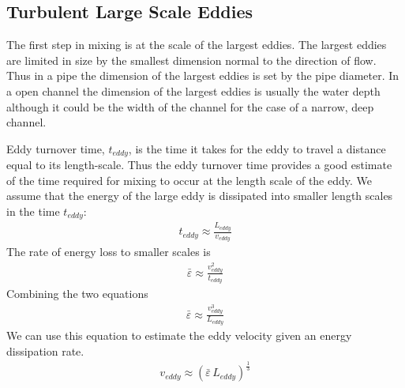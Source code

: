 \documentclass[letterpaper,10pt,english]{sphinxmanual}
\begin{document}
\subsection{Turbulent Large Scale Eddies}
\label{\detokenize{Rapid_Mix/RM_Derivations:turbulent-large-scale-eddies}}\label{\detokenize{Rapid_Mix/RM_Derivations:heading-turbulent-large-scale-eddies}}
The first step in mixing is at the scale of the largest eddies. The largest eddies are limited in size by the smallest dimension normal to the direction of flow. Thus in a pipe the dimension of the largest eddies is set by the pipe diameter. In a open channel the dimension of the largest eddies is usually the water depth although it could be the width of the channel for the case of a narrow, deep channel.

Eddy turnover time, \(t_{eddy}\), is the time it takes for the eddy to travel a distance equal to its length-scale. Thus the eddy turnover time provides a good estimate of the time required for mixing to occur at the length scale of the eddy. We assume that the energy of the large eddy is dissipated into smaller length scales in the time \(t_{eddy}\):
\begin{equation}\label{equation:Rapid_Mix/RM_Derivations:Rapid_Mix/RM_Derivations:34}
\begin{split}t_{eddy} \approx \frac{L_{eddy}}{v_{eddy}}\end{split}
\end{equation}
The rate of energy loss to smaller scales is
\begin{equation}\label{equation:Rapid_Mix/RM_Derivations:Rapid_Mix/RM_Derivations:35}
\begin{split}\bar\varepsilon \approx\frac{v_{eddy}^2}{t_{eddy}}\end{split}
\end{equation}
Combining the two equations
\begin{equation}\label{equation:Rapid_Mix/RM_Derivations:Rapid_Mix/RM_Derivations:36}
\begin{split}\bar\varepsilon \approx\frac{v_{eddy}^3}{L_{eddy}}\end{split}
\end{equation}
We can use this equation to estimate the eddy velocity given an energy dissipation rate.
\begin{equation}\label{equation:Rapid_Mix/RM_Derivations:Rapid_Mix/RM_Derivations:37}
\begin{split}v_{eddy} \approx \left( \bar\varepsilon \, L_{eddy} \right)^\frac{1}{3}\end{split}
\end{equation}
\end{document}
